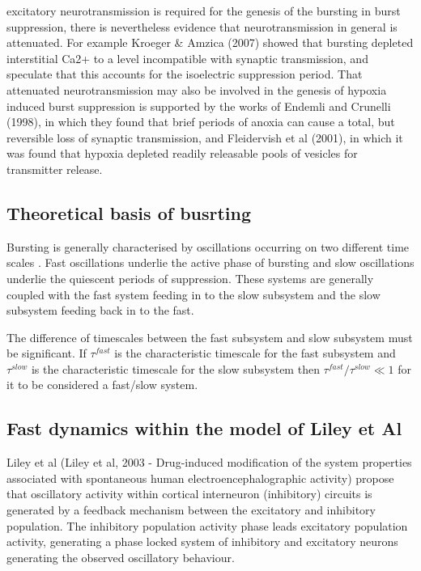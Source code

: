\documentclass[a4paper,12pt]{article}
\begin{document}
excitatory neurotransmission is required for the genesis of the bursting
in burst suppression, there is nevertheless evidence that
neurotransmission in general is attenuated. For example Kroeger \&
Amzica (2007) showed that bursting depleted interstitial Ca2+ to a
level incompatible with synaptic transmission, and speculate that this
accounts for the isoelectric suppression period. That attenuated
neurotransmission may also be involved in the genesis of hypoxia
induced burst suppression is supported by the works of Endemli and
Crunelli (1998), in which they found that brief periods of anoxia can
cause a total, but reversible loss of synaptic transmission, and
Fleidervish et al (2001), in which it was found that hypoxia depleted
readily releasable pools of vesicles for transmitter release.

\subsection{Theoretical basis of busrting}
Bursting is generally characterised by oscillations occurring on two different time scales \cite{izikevich2007_1}. Fast
oscillations underlie the active phase of bursting and slow oscillations underlie the quiescent periods of suppression. These systems are generally coupled with the fast system feeding in to the slow subsystem and the slow subsystem feeding back in to the fast.

The difference of timescales between the fast subsystem and slow subsystem must be significant. If $\tau^{fast}$ is the characteristic timescale for the fast subsystem and $\tau^{slow}$ is the characteristic timescale for the slow subsystem then $\tau^{fast}/\tau^{slow} \ll 1$ for it to be considered a fast/slow system.

\subsection{Fast dynamics within the model of Liley et Al}
Liley et al (Liley et al, 2003 - Drug-induced modification of the system properties associated
with spontaneous human electroencephalographic activity) propose that oscillatory activity within cortical interneuron
(inhibitory) circuits is generated by a feedback mechanism between the excitatory and inhibitory population.
The inhibitory population activity phase leads excitatory population activity, generating a phase locked system of
inhibitory and excitatory neurons generating the observed oscillatory behaviour.
\end{document}
